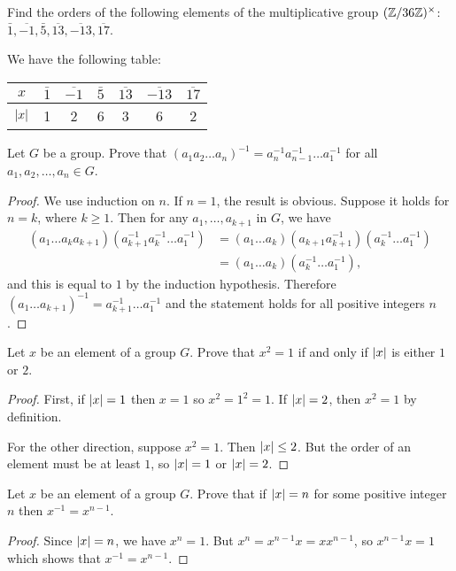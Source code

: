  Find the orders of the following elements of the
multiplicative group $(\mathbb{Z}/36\mathbb{Z})^\times$:
$\bar1, \overline{-1}, \bar5, \overline{13}, \overline{-13},
\overline{17}$.
\begin{solution}
  We have the following table:
  \begin{center}
    \begin{tabular}{c|c|c|c|c|c|c}
      $x$ & $\bar1$ & $\overline{-1}$ & $\bar5$ & $\overline{13}$
      & $\overline{-13}$ & $\overline{17}$ \\\hline
      $\lvert{x}\rvert$ & 1 & 2 & 6 & 3 & 6 & 2
    \end{tabular}
  \end{center}
\end{solution}

 Let $G$ be a group. Prove that
$(a_1a_2\dots a_n)^{-1} = a_n^{-1}a_{n-1}^{-1}\dots a_1^{-1}$ for all
$a_1,a_2,\dots,a_n\in G$.
\begin{proof}
  We use induction on $n$. If $n = 1$, the result is obvious. Suppose
  it holds for $n = k$, where $k\geq1$. Then for any
  $a_1,\dots,a_{k+1}$ in $G$, we have
  \begin{align*}
    (a_1\dots a_ka_{k+1})(a_{k+1}^{-1}a_k^{-1}\dots a_1^{-1})
    &= (a_1\dots a_k)(a_{k+1}a_{k+1}^{-1})(a_k^{-1}\dots a_1^{-1}) \\
    &= (a_1\dots a_k)(a_k^{-1}\dots a_1^{-1}),
  \end{align*}
  and this is equal to $1$ by the induction hypothesis. Therefore
  $(a_1\dots a_{k+1})^{-1} = a_{k+1}^{-1}\dots a_1^{-1}$ and the
  statement holds for all positive integers $n$.
\end{proof}

 Let $x$ be an element of a group $G$. Prove that
$x^2 = 1$ if and only if $\lvert{x}\rvert$ is either $1$ or $2$.
\begin{proof}
  First, if $\lvert{x}\rvert = 1$ then $x = 1$ so $x^2 = 1^2 = 1$. If
  $\lvert{x}\rvert = 2$, then $x^2 = 1$ by definition.

  For the other direction, suppose $x^2 = 1$. Then $\lvert{x}\rvert\leq2$. But
  the order of an element must be at least $1$, so $\lvert{x}\rvert = 1$ or
  $\lvert{x}\rvert = 2$.
\end{proof}

 Let $x$ be an element of a group $G$. Prove that if
$\lvert{x}\rvert = n$ for some positive integer $n$ then $x^{-1} = x^{n-1}$.
\begin{proof}
  Since $\lvert{x}\rvert = n$, we have $x^n = 1$. But
  $x^n = x^{n-1}x = xx^{n-1}$, so $x^{n-1}x = 1$ which shows that
  $x^{-1} = x^{n-1}$.
\end{proof}

